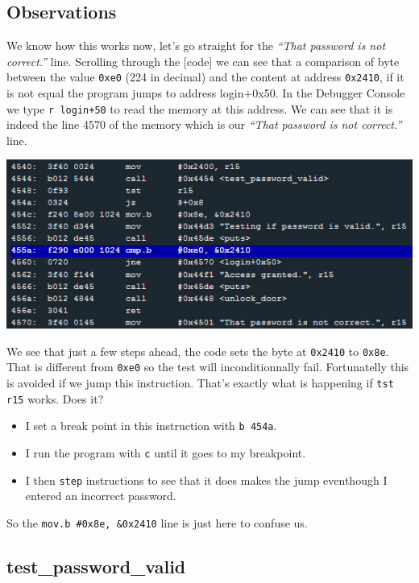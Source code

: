 \documentclass[a4paper,11pt]{article}
\begin{document}
\subsection{Observations}\label{observations-1}

We know how this works now, let's go straight for the \emph{``That
password is not correct.''} line. Scrolling through the {[}code{]} we
can see that a comparison of byte between the value \texttt{0xe0} (224
in decimal) and the content at address \texttt{0x2410}, if it is not
equal the program jumps to address login+0x50. In the Debugger Console
we type \texttt{r login+50} to read the memory at this address. We can
see that it is indeed the line 4570 of the memory which is our
\emph{``That password is not correct.''} line.

\includegraphics{img/3_1.PNG}

We see that just a few steps ahead, the code sets the byte at
\texttt{0x2410} to \texttt{0x8e}. That is different from \texttt{0xe0}
so the test will inconditionnally fail. Fortunatelly this is avoided if
we jump this instruction. That's exactly what is happening if
\texttt{tst r15} works. Does it?

\begin{itemize}
\itemsep1pt\parskip0pt
\item
  I set a break point in this instruction with \texttt{b 454a}.
\item
  I run the program with \texttt{c} until it goes to my breakpoint.
\item
  I then \texttt{step} instructions to see that it does makes the jump
  eventhough I entered an incorrect password.
\end{itemize}

So the \texttt{mov.b \#0x8e, \&0x2410} line is just here to confuse us.

\subsection{test\_password\_valid}\label{testux5fpasswordux5fvalid}
\end{document}
